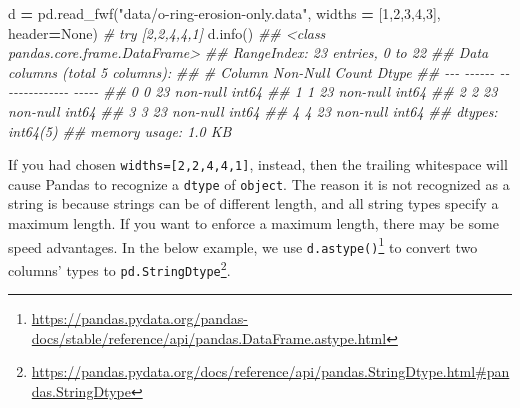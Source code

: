 \documentclass[
  12pt,
  krantz2]{krantz}
\makeatletter
\newenvironment{Shaded}{\begin{snugshade}}{\end{snugshade}}
\newcommand{\CommentTok}[1]{\textcolor[rgb]{0.37,0.37,0.37}{\textit{#1}}}
\newcommand{\DecValTok}[1]{\textcolor[rgb]{0.06,0.06,0.06}{#1}}
\newcommand{\NormalTok}[1]{#1}
\newcommand{\OperatorTok}[1]{\textcolor[rgb]{0.43,0.43,0.43}{\textbf{#1}}}
\newcommand{\StringTok}[1]{\textcolor[rgb]{0.5,0.5,0.5}{#1}}
\newcommand{\VariableTok}[1]{\textcolor[rgb]{0,0,0}{#1}}
\renewcommand{\href}[2]{#2\footnote{\url{#1}}}
\newenvironment{kframe}{%
\medskip{}
\setlength{\fboxsep}{.8em}
 \def\at@end@of@kframe{}%
 \ifinner\ifhmode%
  \def\at@end@of@kframe{\end{minipage}}%
  \begin{minipage}{\columnwidth}%
 \fi\fi%
 \def\FrameCommand##1{\hskip\@totalleftmargin \hskip-\fboxsep
 \colorbox{shadecolor}{##1}\hskip-\fboxsep
     \hskip-\linewidth \hskip-\@totalleftmargin \hskip\columnwidth}%
 \MakeFramed {\advance\hsize-\width
   \@totalleftmargin\z@ \linewidth\hsize
   \@setminipage}}%
 {\par\unskip\endMakeFramed%
 \at@end@of@kframe}
\renewenvironment{Shaded}{\begin{kframe}}{\end{kframe}}
\makeatother
\begin{document}
\begin{Shaded}
\begin{Highlighting}[]
\NormalTok{d }\OperatorTok{=}\NormalTok{ pd.read\_fwf(}\StringTok{"data/o{-}ring{-}erosion{-}only.data"}\NormalTok{, }
\NormalTok{                widths }\OperatorTok{=}\NormalTok{ [}\DecValTok{1}\NormalTok{,}\DecValTok{2}\NormalTok{,}\DecValTok{3}\NormalTok{,}\DecValTok{4}\NormalTok{,}\DecValTok{3}\NormalTok{], header}\OperatorTok{=}\VariableTok{None}\NormalTok{) }\CommentTok{\# try [2,2,4,4,1]}
\NormalTok{d.info()}
\CommentTok{\#\# \textless{}class \textquotesingle{}pandas.core.frame.DataFrame\textquotesingle{}\textgreater{}}
\CommentTok{\#\# RangeIndex: 23 entries, 0 to 22}
\CommentTok{\#\# Data columns (total 5 columns):}
\CommentTok{\#\#  \#   Column  Non{-}Null Count  Dtype}
\CommentTok{\#\# {-}{-}{-}  {-}{-}{-}{-}{-}{-}  {-}{-}{-}{-}{-}{-}{-}{-}{-}{-}{-}{-}{-}{-}  {-}{-}{-}{-}{-}}
\CommentTok{\#\#  0   0       23 non{-}null     int64}
\CommentTok{\#\#  1   1       23 non{-}null     int64}
\CommentTok{\#\#  2   2       23 non{-}null     int64}
\CommentTok{\#\#  3   3       23 non{-}null     int64}
\CommentTok{\#\#  4   4       23 non{-}null     int64}
\CommentTok{\#\# dtypes: int64(5)}
\CommentTok{\#\# memory usage: 1.0 KB}
\end{Highlighting}
\end{Shaded}

If you had chosen \texttt{widths={[}2,2,4,4,1{]}}, instead, then the trailing whitespace will cause Pandas to recognize a \texttt{dtype} of \texttt{object}. The reason it is not recognized as a string is because strings can be of different length, and all string types specify a maximum length. If you want to enforce a maximum length, there may be some speed advantages. In the below example, we use \href{https://pandas.pydata.org/pandas-docs/stable/reference/api/pandas.DataFrame.astype.html}{\texttt{d.astype()}} to convert two columns' types to \href{https://pandas.pydata.org/docs/reference/api/pandas.StringDtype.html\#pandas.StringDtype}{\texttt{pd.StringDtype}}.
\end{document}
